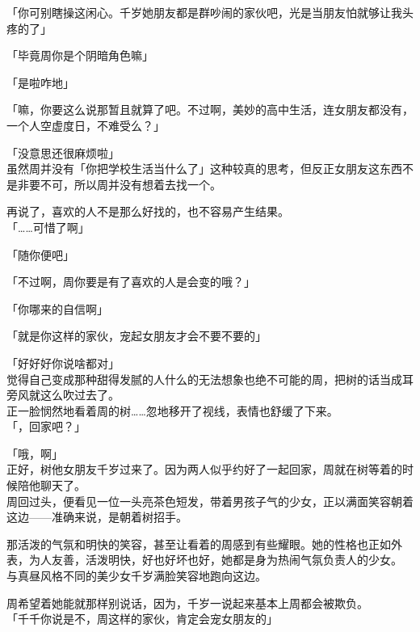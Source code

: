 「你可别瞎操这闲心。千岁她朋友都是群吵闹的家伙吧，光是当朋友怕就够让我头疼的了」

「毕竟周你是个阴暗角色嘛」

「是啦咋地」

「嘛，你要这么说那暂且就算了吧。不过啊，美妙的高中生活，连女朋友都没有，一个人空虚度日，不难受么？」

「没意思还很麻烦啦」\\

虽然周并没有「你把学校生活当什么了」这种较真的思考，但反正女朋友这东西不是非要不可，所以周并没有想着去找一个。

再说了，喜欢的人不是那么好找的，也不容易产生结果。\\

「……可惜了啊」

「随你便吧」

「不过啊，周你要是有了喜欢的人是会变的哦？」

「你哪来的自信啊」

「就是你这样的家伙，宠起女朋友才会不要不要的」

「好好好你说啥都对」\\

觉得自己变成那种甜得发腻的人什么的无法想象也绝不可能的周，把树的话当成耳旁风就这么吹过去了。\\

正一脸悯然地看着周的树……忽地移开了视线，表情也舒缓了下来。\\

「，回家吧？」

「哦，啊」\\

正好，树他女朋友千岁过来了。因为两人似乎约好了一起回家，周就在树等着的时候陪他聊天了。\\

周回过头，便看见一位一头亮茶色短发，带着男孩子气的少女，正以满面笑容朝着这边——准确来说，是朝着树招手。

那活泼的气氛和明快的笑容，甚至让看着的周感到有些耀眼。她的性格也正如外表，为人友善，活泼明快，好也好坏也好，她都是身为热闹气氛负责人的少女。\\

与真昼风格不同的美少女千岁满脸笑容地跑向这边。

周希望着她能就那样别说话，因为，千岁一说起来基本上周都会被欺负。\\

「千千你说是不，周这样的家伙，肯定会宠女朋友的」

